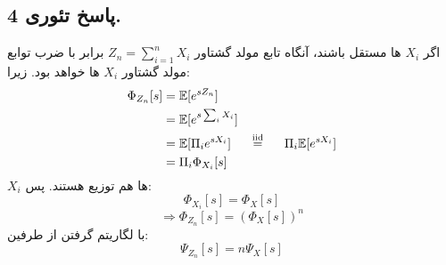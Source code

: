 \documentclass[]{article}
\begin{document}
	\subsection{پاسخ تئوری 4.}
	اگر $X_i$ ها مستقل باشند، آنگاه تابع مولد گشتاور $Z_n = \sum_{i=1}^{n} X_i$ برابر با ضرب توابع مولد گشتاور $X_i$ ها خواهد بود. زیرا:
	\begin{equation}
		\nonumber
		\begin{split}
			\Phi_{Z_n}[s] &= \mathbb{E}[e^{sZ_n}] \\
			& = \mathbb{E}[e^{s\sum_{i}X_i}] \\
			& = \mathbb{E}[\Pi_{i}e^{sX_i}] \hspace{0.5cm} \overset{\scriptsize \text{iid}}{=} \hspace{0.5cm} \Pi_{i} \mathbb{E}[e^{sX_i}] \\
			& = \Pi_{i} \Phi_{X_i}[s]
		\end{split}
	\end{equation}
	$X_i$ ها هم توزیع هستند. پس:
	\begin{equation}
		\nonumber
		\Phi_{X_i}[s] = \Phi_{X}[s]
	\end{equation}
	\begin{equation}
		\nonumber
		\Rightarrow\Phi_{Z_n}[s] = (\Phi_{X}[s])^n
	\end{equation}
	با لگاریتم گرفتن از طرفین:
	\begin{equation}
		\nonumber
		\Psi_{Z_n}[s] = n \Psi_{X}[s]
	\end{equation}
	\newpage
\end{document}
